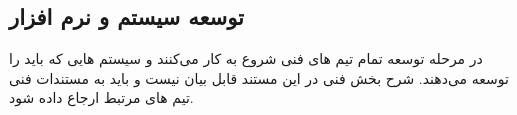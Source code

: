 \subsection{توسعه سیستم و نرم افزار}

در مرحله توسعه تمام تیم های فنی شروع به کار می‌کنند و سیستم هایی که باید را توسعه می‌دهند. شرح بخش فنی در این مستند قابل بیان نیست و باید به مستندات فنی تیم های مرتبط
ارجاع داده شود.

